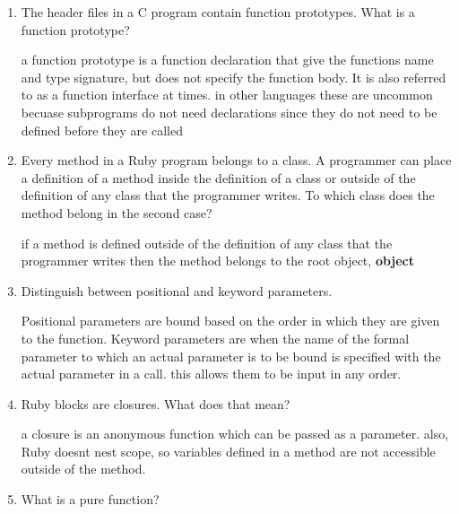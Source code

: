 \begin{enumerate}
  \item The header files in a C program contain function
    prototypes. What is a function prototype?

    \begin{answer}
      a function prototype is a function declaration that give the functions name
      and type signature, but does not specify the function body.
      It is also referred to as a function interface at times. in other languages 
      these are uncommon becuase subprograms do not need declarations since they do
      not need to be defined before they are called
    \end{answer}

  \item Every method in a Ruby program belongs to a class.
    A programmer can place a definition of a method inside
    the definition of a class or outside of the definition
    of any class that the programmer writes. To which class
    does the method belong in the second case?

    \begin{answer}
      if a method is defined outside of the definition of any class that the
      programmer writes then the method belongs to the root object, \textbf{object}
      
    \end{answer}

  \item Distinguish between positional and keyword parameters.

    \begin{answer}
      Positional parameters are bound based on the order in which they are given
      to the function. Keyword parameters are when the name of the formal parameter
      to which  an actual parameter is to be bound is specified with the actual 
      parameter in a call. this allows them to be input in any order.
    \end{answer}

  \item Ruby blocks are closures. What does that mean?

    \begin{answer}
      a closure is an anonymous function which can be passed as a parameter. also,
      Ruby doesnt nest scope, so variables defined in a method are not accessible 
      outside of the method.
    \end{answer}

  \item What is a pure function?
    

\end{enumerate}
